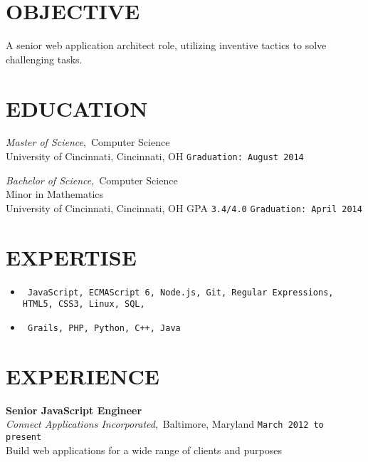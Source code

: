 \documentclass[11pt, line]{res}
\begin{document}
	\address{8228 Melrose Ln\\ Maineville, OH 45039\\ 513-259-0656\\ ross@rhadden.com}

	\begin{resume}
		\vspace{-16pt}
		\section{OBJECTIVE}
			A senior web application architect role, utilizing inventive tactics to solve challenging tasks.

		\section{EDUCATION}
				\textit{Master of Science},\, Computer Science \\
				University of Cincinnati, Cincinnati, OH
					\hfill \texttt{Graduation: August 2014}

			\vspace{-2pt}
				\textit{Bachelor of Science},\, Computer Science \\
				Minor in Mathematics \\
				University of Cincinnati, Cincinnati, OH
					\hspace{16pt} GPA \texttt{3.4/4.0}
					\hfill \texttt{Graduation: April 2014}

		\section{EXPERTISE}
			\begin{itemize}[leftmargin=0pt]
				\item[]
				\texttt{
					JavaScript,
					ECMAScript 6,
					Node.js,
					Git,
					Regular Expressions,
					HTML5,
					CSS3,
					Linux,
					SQL,
				}
				\item[]
				\texttt{
					Grails,
					PHP,
					Python,
					C++,
					Java
				}
			\end{itemize}

		\section{EXPERIENCE}
				\textbf{Senior JavaScript Engineer} \\
				\textit{Connect Applications Incorporated},\, Baltimore, Maryland
					\hfill \texttt{March 2012 to present} \\
				Build web applications for a wide range of clients and purposes


\end{resume}
\end{document}
